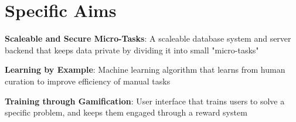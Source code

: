 \section*{Specific Aims}
\begin{compactenum}
\item \textbf{Scaleable and Secure Micro-Tasks}: A scaleable database system and server backend that keeps data private by dividing it into small "micro-tasks"
\item \textbf{Learning by Example}: Machine learning algorithm that learns from human curation to improve efficiency of manual tasks
\item \textbf{Training through Gamification}: User interface that trains users to solve a specific problem, and keeps them engaged through a reward system 
\end{compactenum}

